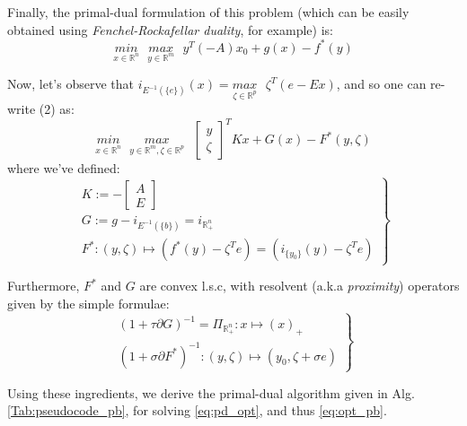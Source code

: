 \documentclass[a4paper,10pt,journal]{IEEEtran}
\begin{document}
Finally, the primal-dual formulation of this problem (which can be easily obtained using
\textit{Fenchel-Rockafellar duality}, for example) is:
\begin{equation}
  \underset{x \in \mathbb{R}^n}{min}\text{ }\underset{y \in \mathbb{R}^m}{max}\text{ }{y^T(-A)x_0 + g(x) - f^*(y)}
\end{equation}

Now, let's observe that $i_{E^{-1}(\{e\})}(x) = \underset{\zeta \in \mathbb{R}^p}{max}\text{ }\zeta^T(e - Ex)$, and so one can re-write (2) as:
\begin{equation}
  \underset{x \in \mathbb{R}^n}{min}\text{ }\underset{y \in \mathbb{R}^m, \zeta \in \mathbb{R}^p}{max}\text{ }
  \begin{bmatrix}y\\\zeta\end{bmatrix}^TKx + G(x) - F^*(y, \zeta)
  \label{eq:pd_opt}
\end{equation}
where we've defined:
\begin{equation}
  \left.
  \begin{aligned}
    K := -\begin{bmatrix}A\\E\end{bmatrix}\\
    G := g - i_{E^{-1}(\{b\})} = i_{\mathbb{R}_{+}^n}\\
    F^*: (y, \zeta) \mapsto (f^*(y) - \zeta^Te) = (i_{\{y_0\}}(y) - \zeta^Te)
  \end{aligned}
  \right\}
\end{equation}

Furthermore, $F^*$ and $G$ are convex l.s.c, with resolvent (a.k.a \textit{proximity}) operators given by the simple formulae:
\begin{equation}
  \left.
  \begin{aligned}
    (1 + \tau \partial G)^{-1} = \Pi_{\mathbb{R}_+^n}: x \mapsto (x)_+\\
    (1 + \sigma \partial F^*)^{-1}: (y, \zeta) \mapsto (y_0, \zeta + \sigma e)
  \end{aligned}
  \right\}
\end{equation}

Using these ingredients, we derive the primal-dual algorithm given in Alg.\ref{Tab:pseudocode_pb}, 
for solving \eqref{eq:pd_opt}, and thus \eqref{eq:opt_pb}.
\end{document}
